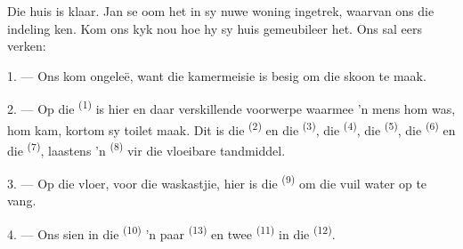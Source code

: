 %
%
%

\VUsaut{6.0mm}
\VUsaut{1.4mm}
\VUsaut{0.4mm}
\VUsaut{2.2mm}

Die huis is klaar. Jan se oom het in sy nuwe woning ingetrek, waarvan ons die indeling
ken. Kom ons kyk nou hoe hy sy huis gemeubileer het. Ons sal eers verken:

\VUsaut{3.0mm}

1. --- Ons kom ongeleë, want die kamermeisie is besig om die  skoon te
maak.

2. --- Op die  \textsuperscript{(1)} is hier en daar verskillende
voorwerpe waarmee 'n mens hom was, hom kam, kortom sy toilet maak. Dit is die
 \textsuperscript{(2)} en die  \textsuperscript{(3)},
die  \textsuperscript{(4)}, die  \textsuperscript{(5)},
die  \textsuperscript{(6)} en die  \textsuperscript{(7)},
laastens 'n  \textsuperscript{(8)} vir die vloeibare tandmiddel.

3. --- Op die vloer, voor die waskastjie, hier is die 
\textsuperscript{(9)} om die vuil water op te vang.

4. --- Ons sien in die  \textsuperscript{(10)} 'n paar
 \textsuperscript{(13)} en twee 
\textsuperscript{(11)} in die  \textsuperscript{(12)}.

